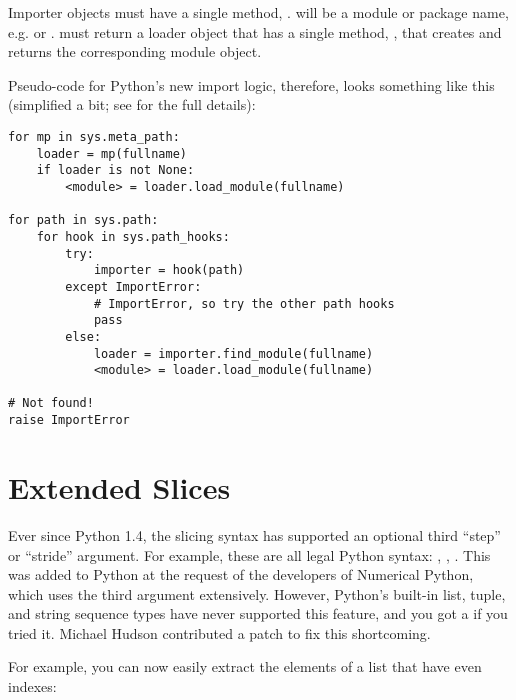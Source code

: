\documentclass{howto}
\begin{document}
Importer objects must have a single method,
.  
will be a module or package name, e.g.  or
.   must return a loader object
that has a single method, , that
creates and returns the corresponding module object.

Pseudo-code for Python's new import logic, therefore, looks something
like this (simplified a bit; see  for the full details):

\begin{verbatim}
for mp in sys.meta_path:
    loader = mp(fullname)
    if loader is not None:
        <module> = loader.load_module(fullname)
        
for path in sys.path:
    for hook in sys.path_hooks:
        try:
            importer = hook(path)
        except ImportError:
            # ImportError, so try the other path hooks
            pass
        else:
            loader = importer.find_module(fullname)
            <module> = loader.load_module(fullname)

# Not found!
raise ImportError
\end{verbatim}

\begin{seealso}


\end{seealso}


\section{Extended Slices\label{section-slices}}

Ever since Python 1.4, the slicing syntax has supported an optional
third ``step'' or ``stride'' argument.  For example, these are all
legal Python syntax: , ,
.  This was added to Python at the request of
the developers of Numerical Python, which uses the third argument
extensively.  However, Python's built-in list, tuple, and string
sequence types have never supported this feature, and you got a
 if you tried it.  Michael Hudson contributed a
patch to fix this shortcoming.

For example, you can now easily extract the elements of a list that
have even indexes:
\end{document}
